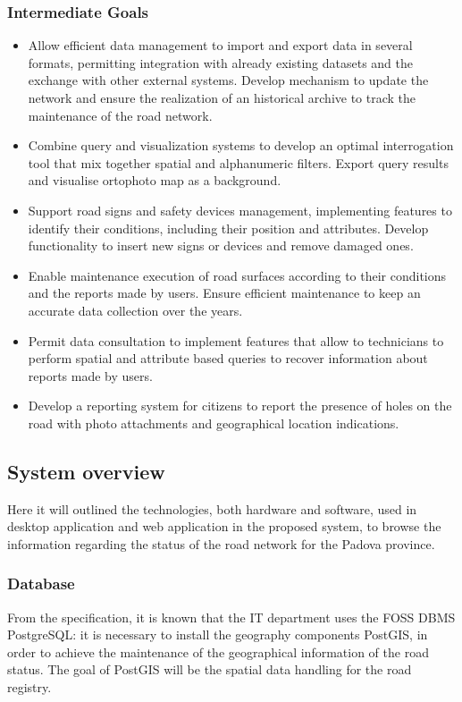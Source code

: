\subsubsection{Intermediate  Goals}
\begin{itemize}
    \item Allow efficient data management to import and export data in several formats, permitting integration with already existing datasets and the exchange with other external systems. Develop mechanism to update the network and ensure the realization of an historical archive to track the maintenance of the road network.
    \item Combine query and visualization systems to develop an optimal interrogation tool that mix together spatial and alphanumeric filters. Export query results and visualise ortophoto map as a background.
    \item Support road signs and safety devices management, implementing features to identify their conditions, including their position and attributes. Develop functionality to insert new signs or devices and remove damaged ones.
    \item Enable maintenance execution of road surfaces according to their conditions and the reports made by users. Ensure efficient maintenance to keep an accurate data collection over the years.
    \item Permit data consultation to implement features that allow to technicians to perform spatial and attribute based queries to recover information about reports made by users.
    \item Develop a reporting system for citizens to report the presence of holes on the road  with photo attachments and geographical location indications.
    
\end{itemize}

\subsection{System overview}
Here it will outlined the technologies, both hardware and software, used in desktop application and web application in the proposed system, to browse the information regarding the status of the road network for the Padova province.

\subsubsection{Database}
From the specification, it is known that the IT department uses the FOSS DBMS PostgreSQL: it is necessary to install the geography components PostGIS, in order to achieve the maintenance of the geographical information of the road status.
The goal of PostGIS will be the spatial data handling for the road registry.

